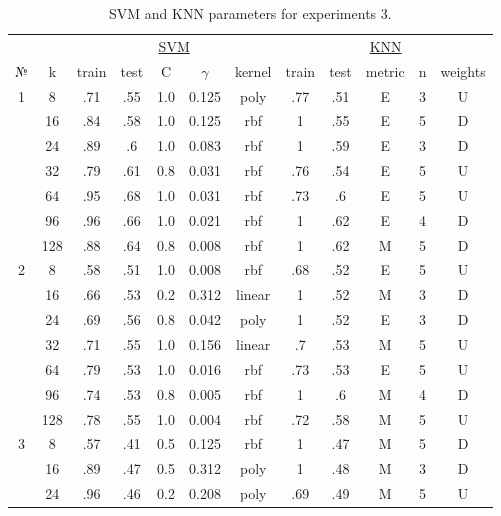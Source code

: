 \begin{table}
\centering
\caption{SVM and KNN parameters for experiments 3.}
\label{tab:params_3_svm_knn}
\begin{tabular}{|c|c|ccccc||ccccc|}\hline
& & \multicolumn{5}{c||}{\underline{SVM}} & \multicolumn{5}{c|}{\underline{KNN}}\\
№ &   k & train & test &   C & $\gamma$ &  kernel & train & test & metric & n & weights \\\hline
1 &   8 &   .71 &  .55 & 1.0 &    0.125 &    poly &   .77 &  .51 &      E & 3 &       U \\
  &  16 &   .84 &  .58 & 1.0 &    0.125 &     rbf &     1 &  .55 &      E & 5 &       D \\
  &  24 &   .89 &   .6 & 1.0 &    0.083 &     rbf &     1 &  .59 &      E & 3 &       D \\
  &  32 &   .79 &  .61 & 0.8 &    0.031 &     rbf &   .76 &  .54 &      E & 5 &       U \\
  &  64 &   .95 &  .68 & 1.0 &    0.031 &     rbf &   .73 &   .6 &      E & 5 &       U \\
  &  96 &   .96 &  .66 & 1.0 &    0.021 &     rbf &     1 &  .62 &      E & 4 &       D \\
  & 128 &   .88 &  .64 & 0.8 &    0.008 &     rbf &     1 &  .62 &      M & 5 &       D \\\hline
2 &   8 &   .58 &  .51 & 1.0 &    0.008 &     rbf &   .68 &  .52 &      E & 5 &       U \\
  &  16 &   .66 &  .53 & 0.2 &    0.312 &  linear &     1 &  .52 &      M & 3 &       D \\
  &  24 &   .69 &  .56 & 0.8 &    0.042 &    poly &     1 &  .52 &      E & 3 &       D \\
  &  32 &   .71 &  .55 & 1.0 &    0.156 &  linear &    .7 &  .53 &      M & 5 &       U \\
  &  64 &   .79 &  .53 & 1.0 &    0.016 &     rbf &   .73 &  .53 &      E & 5 &       U \\
  &  96 &   .74 &  .53 & 0.8 &    0.005 &     rbf &     1 &   .6 &      M & 4 &       D \\
  & 128 &   .78 &  .55 & 1.0 &    0.004 &     rbf &   .72 &  .58 &      M & 5 &       U \\\hline
3 &   8 &   .57 &  .41 & 0.5 &    0.125 &     rbf &     1 &  .47 &      M & 5 &       D \\
  &  16 &   .89 &  .47 & 0.5 &    0.312 &    poly &     1 &  .48 &      M & 3 &       D \\
  &  24 &   .96 &  .46 & 0.2 &    0.208 &    poly &   .69 &  .49 &      M & 5 &       U \\

\end{tabular}
\end{table}
